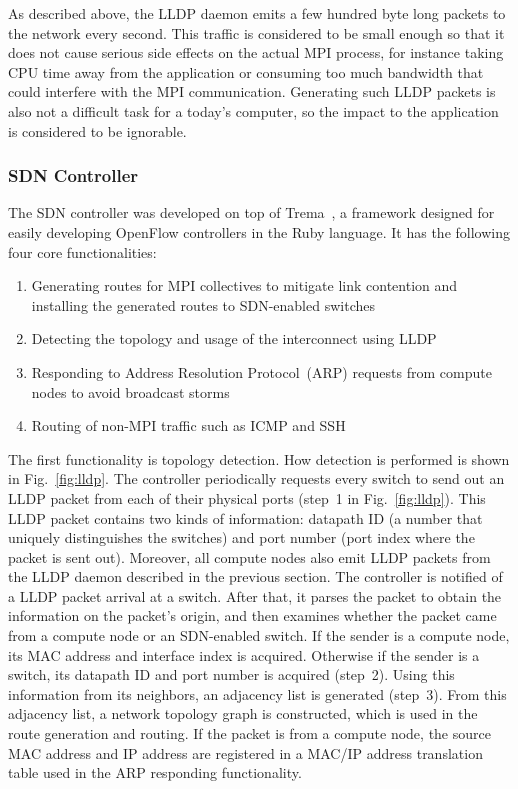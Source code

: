 As described above, the LLDP daemon emits a few hundred byte long packets to
the network every second. This traffic is considered to be small enough so
that it does not cause serious side effects on the actual MPI process, for
instance taking CPU time away from the application or consuming too much
bandwidth that could interfere with the MPI communication. Generating such
LLDP packets is also not a difficult task for a today's  computer, so the
impact to the application is considered to be ignorable.

\subsubsection{SDN Controller}

The SDN controller was developed on top  of Trema~\autocite{trema}, a
framework designed for easily developing OpenFlow controllers in the Ruby
language. It has the following four core functionalities:

\begin{enumerate}
    \item Generating routes for MPI collectives to mitigate link contention
          and installing the generated routes to SDN-enabled switches
    \item Detecting the topology and usage of the interconnect using LLDP
    \item Responding to Address Resolution Protocol~(ARP) requests from
          compute nodes to avoid broadcast storms
    \item Routing of non-MPI traffic such as ICMP and SSH
\end{enumerate}

The first functionality is topology detection. How detection is
performed is shown in Fig.~\ref{fig:lldp}. The controller periodically
requests every switch to send out an LLDP packet from each of their physical
ports (step~1 in Fig.~\ref{fig:lldp}). This LLDP packet contains two kinds of
information: datapath ID (a number that uniquely distinguishes the switches)
and port number (port index where the packet is sent out). Moreover, all
compute nodes also emit LLDP packets from the LLDP daemon described in the
previous section. The controller is notified of a LLDP packet arrival at a
switch. After that, it parses the packet to obtain the information on the
packet's origin, and then examines whether the packet came from a compute node
or an SDN-enabled switch. If the sender is a compute node, its MAC address and
interface index is acquired. Otherwise if the sender is a switch, its datapath
ID and port number is acquired (step~2). Using this information from its
neighbors, an adjacency list is generated (step~3). From this adjacency list,
a network topology graph is constructed, which is used in the route generation
and routing. If the packet is from a compute node, the source MAC address and
IP address are registered in a MAC/IP address translation table used in the
ARP responding functionality.

